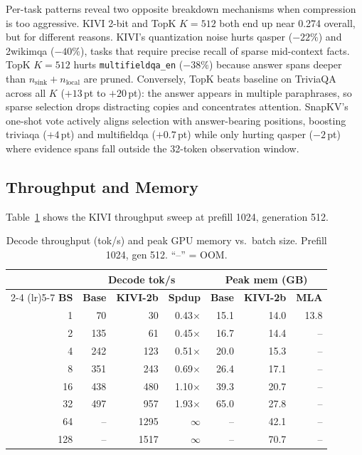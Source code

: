 \documentclass[conference]{IEEEtran}
\begin{document}
Per-task patterns reveal two opposite breakdown mechanisms when
compression is too aggressive.  KIVI 2-bit and TopK $K\!=\!512$ both
end up near 0.274 overall, but for different reasons.  KIVI's
quantization noise hurts qasper ($-22\%$) and 2wikimqa ($-40\%$), tasks
that require precise recall of sparse mid-context facts.  TopK
$K\!=\!512$ hurts \texttt{multifieldqa\_en} ($-38\%$) because answer
spans deeper than $n_\text{sink} + n_\text{local}$ are pruned.
Conversely, TopK beats baseline on TriviaQA across all $K$
($+13$\,pt to $+20$\,pt): the answer appears in multiple paraphrases,
so sparse selection drops distracting copies and concentrates
attention.  SnapKV's one-shot vote actively aligns selection with
answer-bearing positions, boosting triviaqa ($+4$\,pt) and multifieldqa
($+0.7$\,pt) while only hurting qasper ($-2$\,pt) where evidence spans
fall outside the 32-token observation window.

\subsection{Throughput and Memory}

Table~\ref{tab:throughput} shows the KIVI throughput sweep at prefill
1024, generation 512.

\begin{table}[!t]
\centering
\caption{Decode throughput (tok/s) and peak GPU memory vs.\ batch size.
Prefill 1024, gen 512.  ``--'' = OOM.}
\label{tab:throughput}
\setlength{\tabcolsep}{4pt}
\begin{tabular}{@{}rrrrrrr@{}}
\toprule
 & \multicolumn{3}{c}{\textbf{Decode tok/s}} & \multicolumn{3}{c}{\textbf{Peak mem (GB)}} \\
\cmidrule(lr){2-4} \cmidrule(lr){5-7}
\textbf{BS} & \textbf{Base} & \textbf{KIVI-2b} & \textbf{Spdup} & \textbf{Base} & \textbf{KIVI-2b} & \textbf{MLA} \\
\midrule
1   &  70 &   30 & 0.43$\times$ & 15.1 & 14.0 & 13.8 \\
2   & 135 &   61 & 0.45$\times$ & 16.7 & 14.4 &  --   \\
4   & 242 &  123 & 0.51$\times$ & 20.0 & 15.3 &  --   \\
8   & 351 &  243 & 0.69$\times$ & 26.4 & 17.1 &  --   \\
16  & 438 &  480 & 1.10$\times$ & 39.3 & 20.7 &  --   \\
32  & 497 &  957 & 1.93$\times$ & 65.0 & 27.8 &  --   \\
64  &  -- & 1295 & $\infty$     &  --  & 42.1 &  --   \\
128 &  -- & 1517 & $\infty$     &  --  & 70.7 &  --   \\
\bottomrule
\end{tabular}
\end{table}
\end{document}
